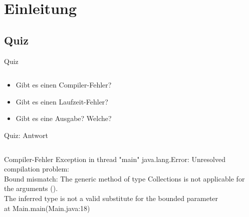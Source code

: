 \documentclass[usepdftitle=false,hyperref={pdfpagelabels=false}]{beamer}
\begin{document}
\title{\titleText}
\subtitle{Sortieren, equals(), hashCode(), abstrakte Klassen, finale Klassen}
\author{\tutor}
\date{\today}
\subject{Programmieren}

\frame{\titlepage}


\section{Einleitung}
\subsection{Quiz}
\begin{frame}{Quiz}
    \inputminted[linenos=true, numbersep=5pt, tabsize=4, fontsize=\tiny]{java}{QuizMain.java}
    \begin{itemize}
        \item Gibt es einen Compiler-Fehler?
        \item Gibt es einen Laufzeit-Fehler?
        \item Gibt es eine Ausgabe? Welche?
    \end{itemize}
\end{frame}

\begin{frame}{Quiz: Antwort}
    \inputminted[linenos=true, numbersep=5pt, tabsize=4, fontsize=\tiny, firstnumber=7, firstline=7, lastline=19, ]{java}{QuizMain.java}
    \begin{block}{Compiler-Fehler}
        {\small
        Exception in thread "main" java.lang.Error: Unresolved compilation problem:\\
        Bound mismatch: The generic method  of 
        type Collections is not applicable for the arguments 
        ().\\
        The inferred type  is not a valid substitute for 
        the bounded parameter \\
        at Main.main(Main.java:18)}
    \end{block}
\end{frame}
\end{document}
